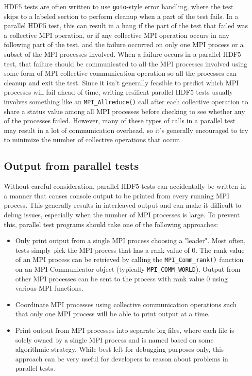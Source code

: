 \documentclass[../HDF5_RFC.tex]{subfiles}
\begin{document}
HDF5 tests are often written to use \texttt{goto}-style error handling, where the test skips to a
labeled section to perform cleanup when a part of the test fails. In a parallel HDF5 test, this
can result in a hang if the part of the test that failed was a collective MPI operation, or if any
collective MPI operation occurs in any following part of the test, and the failure occurred on only
one MPI process or a subset of the MPI processes involved. When a failure occurs in a parallel HDF5
test, that failure should be communicated to all the MPI processes involved using some form of MPI
collective communication operation so all the processes can cleanup and exit the test. Since it isn't
generally feasible to predict which MPI processes will fail ahead of time, writing resilient parallel
HDF5 tests usually involves something like an \texttt{MPI\_Allreduce()} call after each collective
operation to share a status value among all MPI processes before checking to see whether any of the
processes failed. However, many of these types of calls in a parallel test may result in a lot of
communication overhead, so it's generally encouraged to try to minimize the number of collective
operations that occur.

\subsection{Output from parallel tests}

Without careful consideration, parallel HDF5 tests can accidentally be written in a manner that causes
console output to be printed from every running MPI process. This generally results in interleaved output
and can make it difficult to debug issues, especially when the number of MPI processes is large. To
prevent this, parallel test programs should take one of the following approaches:

\begin{itemize}

    \item Only print output from a single MPI process choosing a "leader". Most often, tests simply pick
          the MPI process that has a rank value of 0. The rank value of an MPI process can be retrieved
          by calling the \texttt{MPI\_Comm\_rank()} function on an MPI Communicator object (typically
          \texttt{MPI\_COMM\_WORLD}). Output from other MPI processes can be sent to the process with
          rank value 0 using various MPI functions.
    \item Coordinate MPI processes using collective communication operations such that only one MPI
          process will be able to print output at a time.
    \item Print output from MPI processes into separate log files, where each file is solely owned by a
          single MPI process and is named based on some algorithmic strategy. While best left for
          debugging purposes only, this approach can be very useful for developers to reason about problems
          in parallel tests.

\end{itemize}
\end{document}
